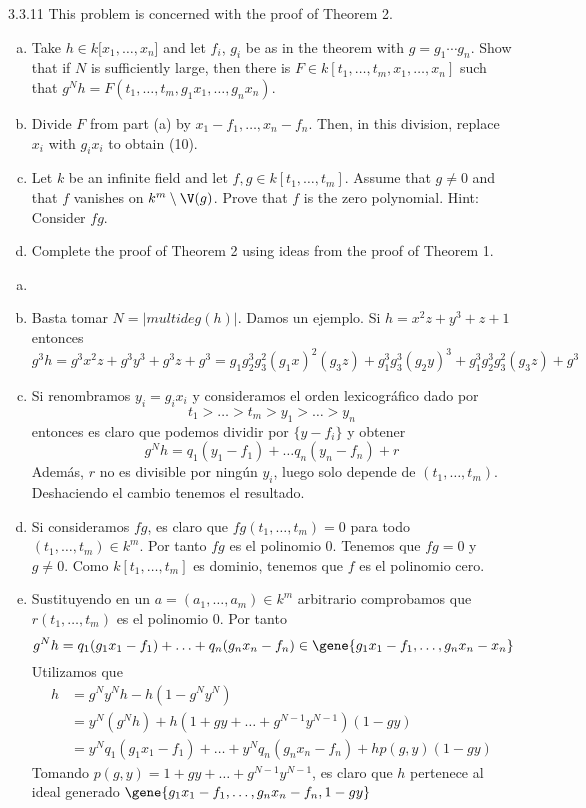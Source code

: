 \documentclass[twoside]{article}
\begin{document}
\newpage

\begin{ejercicio}{3.3.11}
This problem is concerned with the proof of Theorem 2.
\begin{enumerate}[a.]
\item Take $h ∈ k[x_1, \dots , x_n$] and let $f_i$, $g_i$ be as in the theorem with $g = g_1 \cdots g_n$. Show
that if $N$ is sufficiently large, then there is $F ∈ k[t_1, \dots , t_m, x_1, \dots , x_n]$ such that
$g^Nh = F(t_1, \dots , t_m, g_1x_1, \dots , g_nx_n)$.
\item Divide $F$ from part (a) by $x_1 − f_1, \dots , x_n − f_n$. Then, in this division, replace $x_i$ with
$g_ix_i$ to obtain (10).
\item Let $k$ be an infinite field and let $f , g ∈ k[t_1, \dots , t_m]$. Assume that $g \neq 0$ and that $f$
vanishes on $k^m \setminus \V(g)$. Prove that $f$ is the zero polynomial. Hint: Consider $fg$.
\item Complete the proof of Theorem 2 using ideas from the proof of Theorem 1.
\end{enumerate}
\end{ejercicio}
\begin{solucion}
\begin{enumerate}[a.]
\item[]
\item Basta tomar $N = |multideg(h)|$. Damos un ejemplo. Si $h=x^2z+y^3+z+1$ entonces 
$$g^3h = g^3x^2z+g^3y^3+g^3z+g^3 = g_1g_2^3g_3^2(g_1x)^2(g_3z)+g_1^3g_3^3(g_2y)^3+g_1^3g_2^3g_3^2(g_3z)+g^3
$$
\item Si renombramos $y_i = g_ix_i$ y consideramos el orden lexicográfico dado por $$t_1 > \dotsc > t_m  > y_1 > \dotsc > y_n$$
entonces es claro que podemos dividir por $\{y-f_i\}$ y obtener
$$
g^Nh = q_1(y_1 - f_1) + \dotsc q_n(y_n-f_n) + r
$$
Además, $r$ no es divisible por ningún $y_i$, luego solo depende de $(t_1,\dotsc,t_m)$. Deshaciendo el cambio tenemos el resultado.
\item Si consideramos $fg$, es claro que $fg(t_1,\dotsc,t_m)=0$ para todo $(t_1,\dotsc,t_m)\in k^m$. Por tanto $fg$ es el polinomio $0$. Tenemos que $fg=0$ y $g\neq 0$. Como $k[t_1,\dotsc,t_m]$ es dominio, tenemos que $f$ es el polinomio cero.
\item Sustituyendo en un $a=(a_1,\dotsc,a_m)\in k^m$ arbitrario comprobamos que $r(t_1,\dotsc,t_m)$ es el polinomio 0. Por tanto
$$g^Nh= q_1(g_1x_1 - f_1) + \dotsc +  q_n(g_nx_n-f_n)  \in \gene{g_1x_1 -f_1,\dotsc,g_nx_n-x_n}
$$
Utilizamos que 
\begin{align*}
h &= g^Ny^N h - h(1-g^Ny^N)\\
&= y^N(g^Nh)+h(1+gy+\dotsc+g^{N-1}y^{N-1})(1-gy)\\
&=y^Nq_1(g_1x_1 - f_1) + \dotsc + y^Nq_n(g_nx_n-f_n) + hp(g,y)(1-gy)
\end{align*}
Tomando $p(g,y)=1+gy+\dotsc+g^{N-1}y^{N-1}$, es claro que $h$ pertenece al ideal generado $\gene{g_1x_1-f_1,\dotsc,g_nx_n-f_n,1-gy}$
\end{enumerate}
\end{solucion}
\end{document}
